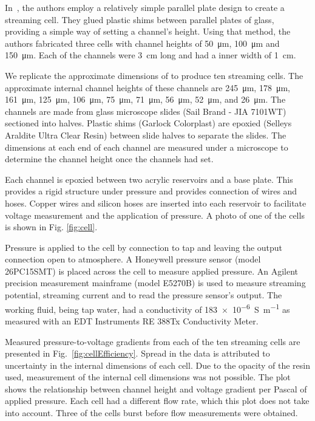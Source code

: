 \documentclass[10pt,final,journal]{IEEEtran}
\begin{document}
    In~\cite{Gu2000}, the authors employ a relatively simple parallel plate design to create a streaming cell.
    They glued plastic shims between parallel plates of glass, providing a simple way of setting a channel's height.
    Using that method, the authors fabricated three cells with channel heights of \SI{50}{\micro\metre}, \SI{100}{\micro\metre} and \SI{150}{\micro\metre}.
    Each of the channels were \SI{3}{\centi\metre} long and had a inner width of \SI{1}{\centi\metre}.

    We replicate the approximate dimensions of \cite{Gu2000} to produce ten streaming cells.
    The approximate internal channel heights of these channels are \SI{245}{\micro\meter}, \SI{178}{\micro\meter}, \SI{161}{\micro\meter}, \SI{125}{\micro\meter}, \SI{106}{\micro\meter}, \SI{75}{\micro\meter}, \SI{71}{\micro\meter}, \SI{56}{\micro\meter}, \SI{52}{\micro\meter}, and \SI{26}{\micro\meter}.
    The channels are made from glass microscope slides (Sail Brand - JIA 7101WT) sectioned into halves.
    Plastic shims (Garlock Colorplast) are epoxied (Selleys Araldite Ultra Clear Resin) between slide halves to separate the slides.
    The dimensions at each end of each channel are measured under a microscope to determine the channel height once the channels had set.

    Each channel is epoxied between two acrylic reservoirs and a base plate.
    This provides a rigid structure under pressure and provides connection of wires and hoses.
    Copper wires and silicon hoses are inserted into each reservoir to facilitate voltage measurement and the application of pressure.
    A photo of one of the cells is shown in Fig. \ref{fig:cell}.

    Pressure is applied to the cell by connection to tap and leaving the output connection open to atmosphere.
    A Honeywell pressure sensor (model 26PC15SMT) is placed across the cell to measure applied pressure.
    An Agilent precision measurement mainframe (model E5270B) is used to measure streaming potential, streaming current and to read the pressure sensor's output.
    The working fluid, being tap water, had a conductivity of \SI{183e-6}{\siemens\per\meter} as measured with an EDT Instruments RE 388Tx Conductivity Meter.

    Measured pressure-to-voltage gradients from each of the ten streaming cells are presented in Fig.~\ref{fig:cellEfficiency}.
    Spread in the data is attributed to uncertainty in the internal dimensions of each cell.
    Due to the opacity of the resin used, measurement of the internal cell dimensions was not possible.
    The plot shows the relationship between channel height and voltage gradient per Pascal of applied pressure.
    Each cell had a different flow rate, which this plot does not take into account.
    Three of the cells burst before flow measurements were obtained.
\end{document}
